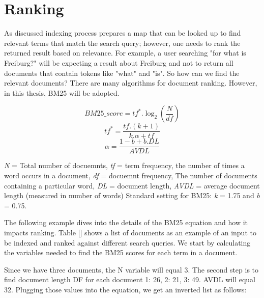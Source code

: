 \section{Ranking}
As discussed indexing process prepares a map that can be looked up to find relevant terms that match the search query; however, one needs to rank the returned result based on relevance. For example, a user searching "for what is Freiburg?" will be expecting a result about Freiburg and not to return all documents that contain tokens like "what" and "is". So how can we find the relevant documents? There are many algorithms for document ranking. However, in this thesis, BM25 will be adopted. 

\begin{equation}
BM25\_score = tf^*.\log_2(\frac{N}{df})
\label{eq:depth}
\end{equation}
\begin{equation}
tf^* = \frac{tf.(k+1)}{k.\alpha+tf}
\label{eq:depth}
\end{equation}
\begin{equation}
\alpha = \frac{1-b+b.DL}{AVDL}
\label{eq:depth}
\end{equation}

\textit{N} = Total number of docuemnts, \textit{tf} = term frequency, the number of times a word occurs in a document, \textit{df} = docuemnt frequency, The number of documents containing a particular word, \textit{DL} = document length, \textit{AVDL} =
average document length (measured in number of words)
Standard setting for BM25: \textit{k} = 1.75 and \textit{b} = 0.75.

The following example dives into the details of the BM25 equation and how it impacts ranking.  Table [] shows a list of documents as an example of an input to be indexed and ranked against different search queries. We start by calculating the variables needed to find the BM25 scores for each term in a document.    

Since we have three documents, the N variable will equal 3. The second step is to find document length DF for each document {1: 26, 2: 21, 3: 49}. AVDL will equal 32. Plugging those values into the equation, we get an inverted list as follows: 

